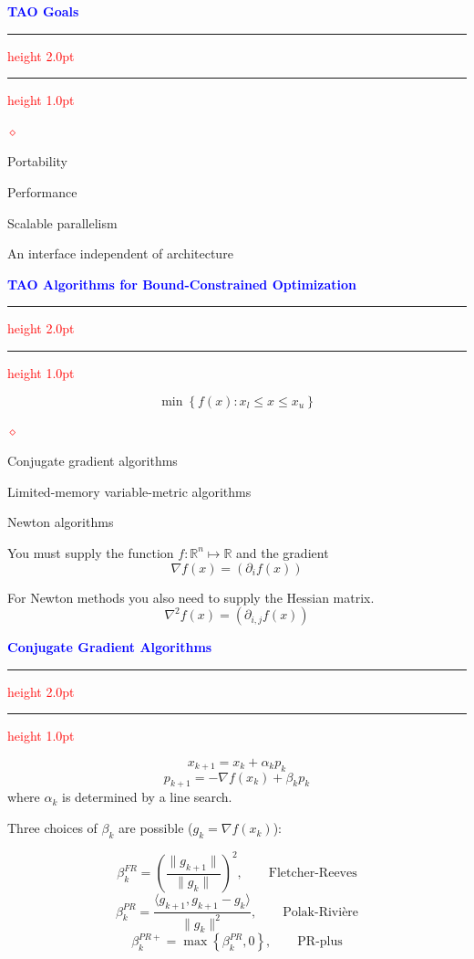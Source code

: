 \documentclass{seminar}
\newcommand{\R}{\mbox{${\mathbb R}$}}
\newcommand{\grad}{\nabla}
\newcommand{\reddiamond}{\textcolor{red}{$\diamond$}}
\newcommand{\redstripe}{\textcolor{red}{\hrule height 2.0pt\hfil}
             \vspace{-1.8pt}
             \textcolor{red}{\hrule height 1.0pt\hfil}
}
\newcommand{\heading}[1]{%
   \centerline{\textcolor{blue}{\textbf{#1}}}%
    \redstripe%
    \bigskip
}
\begin{document}
\begin{slide}

\heading{TAO Goals}

\begin{list}{\reddiamond}{}
\item
Portability
\item
Performance
\item
Scalable parallelism
\item
An interface independent of architecture
\end{list}

\vfill

\end{slide}


\begin{slide}

\heading{TAO Algorithms for Bound-Constrained Optimization}

\[
\min \left \{  f(x) : x_l \le x \le x_u \right \}
\]

\medskip

\begin{list}{\reddiamond}{}
\item
Conjugate gradient algorithms
\item
Limited-memory variable-metric algorithms
\item
Newton algorithms
\end{list}

You must supply the function $ f : \R^n \mapsto \R $ and the
gradient 
\[
\grad f (x) = \left ( \partial _i f(x) \right )
\]

For Newton methods you also need to supply the Hessian matrix.
\[
\grad^2 f (x) = \left ( \partial_{i,j} f(x) \right )
\]

\vfill

\end{slide}

\begin{slide}

\heading{Conjugate Gradient Algorithms}

\[
x_{k+1} = x_k + \alpha_k p_k 
\]
\[
p_{k+1} = - \grad f (x_k) + \beta_k p_k 
\]
where $ \alpha_k $ is determined by a line search.

\medskip

Three choices of $ \beta_k $ are possible ($ g_k = \grad f (x_k ) $):
 
\[
\beta_k^{FR} = \left (
\frac{\| g_{k+1} \|}{\| g_k \|}
\right ) ^ 2 , \qquad \mbox{Fletcher-Reeves}
\]
\[
\beta_k^{PR} = 
\frac{ \langle g_{k+1} , g_{k+1} - g_k \rangle }
{\| g_k \|^2},  \qquad \mbox{Polak-Rivi\`ere}
\]
\[
\beta_k^{PR+} = \max \left \{ \beta_k^{PR} , 0 \right \} , \qquad
\mbox{PR-plus}
\]

\vfill

\end{slide}
\end{document}

